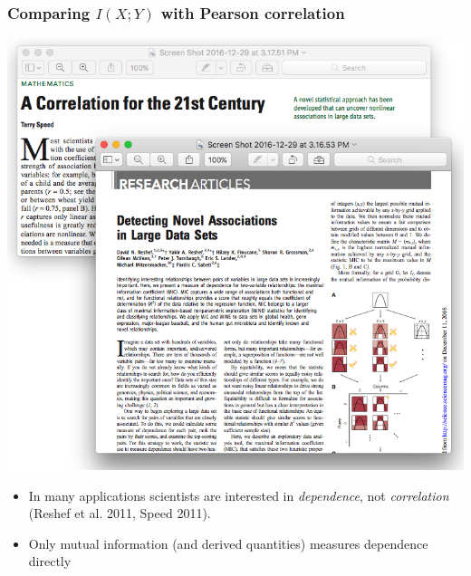 \documentclass{beamer}
\begin{document}
\begin{frame}
\frametitle{Comparing $I(X; Y)$ with Pearson correlation}
\begin{center}
\includegraphics[scale = 0.2]{speed_reshef.png}
\end{center}
\begin{itemize}
\item In many applications scientists are interested in \emph{dependence}, not \emph{correlation} (Reshef et al. 2011, Speed 2011). \pause
\item Only mutual information (and derived quantities) measures dependence directly  \pause
\end{itemize}
\end{frame}

\end{document}
